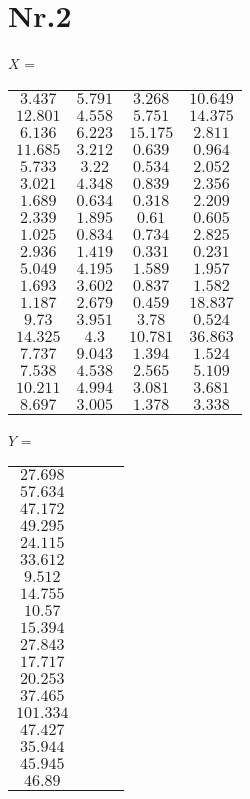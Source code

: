 \documentclass[a4paper,11pt,twoside]{scrartcl}
\begin{document}
\section*{Nr.2}
$X$ = \begin{tabular}{ c  c  c  c }
$3.437$ & $5.791$ & $3.268$ & $10.649$ \\
$12.801$ & $4.558$ & $5.751$ & $14.375$ \\
$6.136$ & $6.223$ & $15.175$ & $2.811$ \\
$11.685$ & $3.212$ & $0.639$ & $0.964$ \\
$5.733$ & $3.22$ & $0.534$ & $2.052$ \\
$3.021$ & $4.348$ & $0.839$ & $2.356$ \\
$1.689$ & $0.634$ & $0.318$ & $2.209$ \\
$2.339$ & $1.895$ & $0.61$ & $0.605$ \\
$1.025$ & $0.834$ & $0.734$ & $2.825$ \\
$2.936$ & $1.419$ & $0.331$ & $0.231$ \\
$5.049$ & $4.195$ & $1.589$ & $1.957$ \\
$1.693$ & $3.602$ & $0.837$ & $1.582$ \\
$1.187$ & $2.679$ & $0.459$ & $18.837$ \\
$9.73$ & $3.951$ & $3.78$ & $0.524$ \\
$14.325$ & $4.3$ & $10.781$ & $36.863$ \\
$7.737$ & $9.043$ & $1.394$ & $1.524$ \\
$7.538$ & $4.538$ & $2.565$ & $5.109$ \\
$10.211$ & $4.994$ & $3.081$ & $3.681$ \\
$8.697$ & $3.005$ & $1.378$ & $3.338$ \\
\end{tabular}
%
$Y$ = \begin{tabular}{ c  c  c  c }
$27.698$ \\
$57.634$ \\
$47.172$ \\
$49.295$ \\
$24.115$ \\
$33.612$ \\
$9.512$ \\
$14.755$ \\
$10.57$ \\
$15.394$ \\
$27.843$ \\
$17.717$ \\
$20.253$ \\
$37.465$ \\
$101.334$ \\
$47.427$ \\
$35.944$ \\
$45.945$ \\
$46.89$ \\
\end{tabular}
\end{document}
